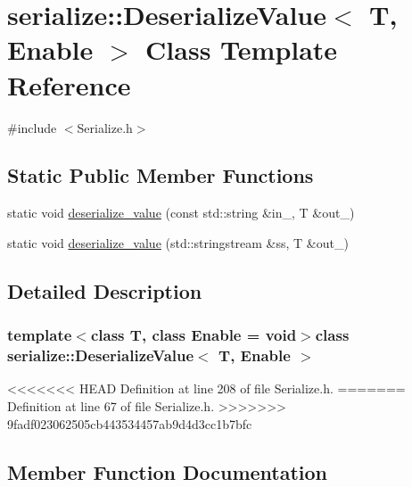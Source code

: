 \hypertarget{classserialize_1_1_deserialize_value}{}\section{serialize\+:\+:Deserialize\+Value$<$ T, Enable $>$ Class Template Reference}
\label{classserialize_1_1_deserialize_value}


{\ttfamily \#include $<$Serialize.\+h$>$}

\subsection*{Static Public Member Functions}
\begin{DoxyCompactItemize}
\item 
static void \hyperlink{classserialize_1_1_deserialize_value_ae086cfe3996b96c0a82785afe0af81b1}{deserialize\+\_\+value} (const std\+::string \&in\+\_\+, T \&out\+\_\+)
\item 
static void \hyperlink{classserialize_1_1_deserialize_value_a85960dc8ca3587ca9c275c0deb679bb7}{deserialize\+\_\+value} (std\+::stringstream \&ss, T \&out\+\_\+)
\end{DoxyCompactItemize}


\subsection{Detailed Description}
\subsubsection*{template$<$class T, class Enable = void$>$class serialize\+::\+Deserialize\+Value$<$ T, Enable $>$}



<<<<<<< HEAD
Definition at line 208 of file Serialize.\+h.
=======
Definition at line 67 of file Serialize.\+h.
>>>>>>> 9fadf023062505cb443534457ab9d4d3cc1b7bfc



\subsection{Member Function Documentation}
\hypertarget{classserialize_1_1_deserialize_value_ae086cfe3996b96c0a82785afe0af81b1}{}
